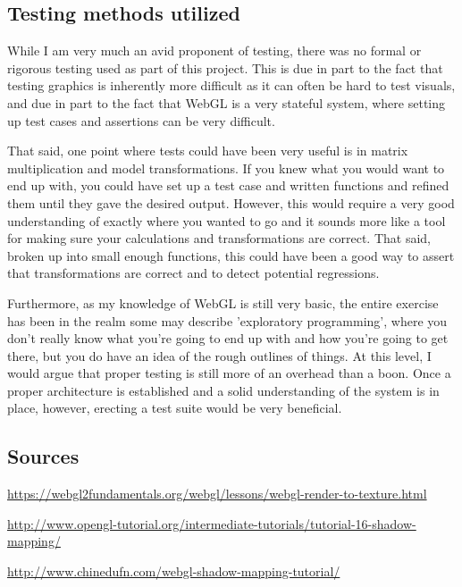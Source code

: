 \documentclass[11pt]{article}
\begin{document}
\subsection{Testing methods utilized}
\label{sec:org022ed0d}
While I am very much an avid proponent of testing, there was no formal or rigorous testing used as part of this project. This is due in part to the fact that testing graphics is inherently more difficult as it can often be hard to test visuals, and due in part to the fact that WebGL is a very stateful system, where setting up test cases and assertions can be very difficult.

That said, one point where tests could have been very useful is in matrix multiplication and model transformations. If you knew what you would want to end up with, you could have set up a test case and written functions and refined them until they gave the desired output. However, this would require a very good understanding of exactly where you wanted to go and it sounds more like a tool for making sure your calculations and transformations are correct. That said, broken up into small enough functions, this could have been a good way to assert that transformations are correct and to detect potential regressions.

Furthermore, as my knowledge of WebGL is still very basic, the entire exercise has been in the realm some may describe 'exploratory programming', where you don't really know what you're going to end up with and how you're going to get there, but you do have an idea of the rough outlines of things. At this level, I would argue that proper testing is still more of an overhead than a boon. Once a proper architecture is established and a solid understanding of the system is in place, however, erecting a test suite would be very beneficial.

\subsection{Sources}
\label{sec:org062d6ea}
\url{https://webgl2fundamentals.org/webgl/lessons/webgl-render-to-texture.html}

\url{http://www.opengl-tutorial.org/intermediate-tutorials/tutorial-16-shadow-mapping/}

\url{http://www.chinedufn.com/webgl-shadow-mapping-tutorial/}
\end{document}
